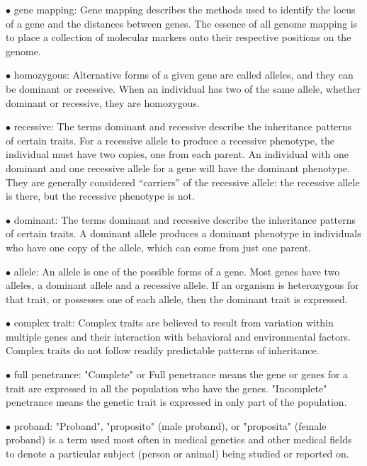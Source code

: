 \documentclass{article}
\begin{document}
\vspace{0.1in}
$\bullet$ gene mapping: 
Gene mapping describes the methods used to identify the locus of a gene and the distances between genes. The essence of all genome mapping is to place a collection of molecular markers onto their respective positions on the genome. 

\vspace{0.1in}
$\bullet$ homozygous:
Alternative forms of a given gene are called alleles, and they can be dominant or recessive. When an individual has two of the same allele, whether dominant or recessive, they are homozygous.

\vspace{0.1in}
$\bullet$ recessive:
 The terms dominant and recessive describe the inheritance patterns of certain traits. For a recessive allele to produce a recessive phenotype, the individual must have two copies, one from each parent. An individual with one dominant and one recessive allele for a gene will have the dominant phenotype. They are generally considered “carriers” of the recessive allele: the recessive allele is there, but the recessive phenotype is not.

\vspace{0.1in}
$\bullet$ dominant:
The terms dominant and recessive describe the inheritance patterns of certain traits. A dominant allele produces a dominant phenotype in individuals who have one copy of the allele, which can come from just one parent.

\vspace{0.1in}
$\bullet$ allele:
An allele is one of the possible forms of a gene. Most genes have two alleles, a dominant allele and a recessive allele. If an organism is heterozygous for that trait, or possesses one of each allele, then the dominant trait is expressed.

\vspace{0.1in}
$\bullet$ complex trait:
Complex traits are believed to result from variation within multiple genes and their interaction with behavioral and environmental factors. Complex traits do not follow readily predictable patterns of inheritance.

\vspace{0.1in}
$\bullet$ full penetrance:
 "Complete" or Full penetrance means the gene or genes for a trait are expressed in all the population who have the genes. "Incomplete" penetrance means the genetic trait is expressed in only part of the population.

\vspace{0.1in}
$\bullet$ proband:
"Proband", "proposito" (male proband), or "proposita" (female proband) is a term used most often in medical genetics and other medical fields to denote a particular subject (person or animal) being studied or reported on.
\end{document}

